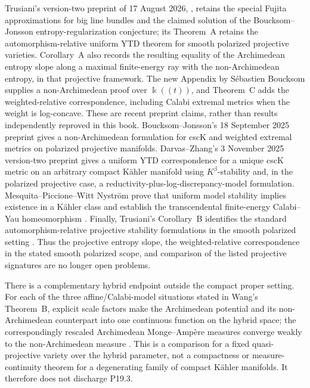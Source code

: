 \documentclass[11pt,a4paper]{article}
\theoremstyle{definition}
\theoremstyle{remark}
\begin{document}
Trusiani's version-two preprint of 17 August 2026,
\cite[Theorem~B and Corollary~A]{Trusiani26}, retains the special Fujita
approximations for big line bundles and the claimed solution of the
Boucksom--Jonsson entropy-regularization conjecture; its Theorem~A retains
the automorphism-relative uniform YTD theorem for smooth polarized
projective varieties.  Corollary~A also records the resulting equality of
the Archimedean entropy slope along a maximal finite-energy ray with the
non-Archimedean entropy, in that projective framework.  The new Appendix by
S\'ebastien Boucksom supplies a non-Archimedean proof over
\(\Bbbk((t))\), and Theorem~C adds the weighted-relative correspondence,
including Calabi extremal metrics when the weight is log-concave.  These are
recent preprint claims, rather than results independently reproved in this
book.  Boucksom--Jonsson's 18 September 2025
preprint \cite{BJ25WeightedYTD} gives a
non-Archimedean formulation for cscK and weighted extremal metrics on
polarized projective manifolds.  Darvas--Zhang's 3 November 2025 version-two
preprint \cite[Theorems~1.6 and~5.5]{DarvasZhang25YTD} gives a uniform
YTD correspondence for a unique cscK metric on an arbitrary compact
Kähler manifold using \(K^\beta\)-stability and, in the polarized
projective case, a reductivity-plus-log-discrepancy-model formulation.
Mesquita--Piccione--Witt Nyström prove that uniform model stability implies
existence in a Kähler class and establish the transcendental finite-energy
Calabi--Yau homeomorphism \cite[Theorems~A and~B]{MPWN25}.  Finally,
Trusiani's Corollary~B identifies the standard automorphism-relative
projective stability formulations in the smooth polarized setting
\cite{Trusiani26}.  Thus the projective entropy slope, the weighted-relative
correspondence in the stated smooth polarized scope, and comparison of the
listed projective signatures are no longer open problems.

There is a complementary hybrid endpoint outside the compact proper setting.
For each of the three affine/Calabi-model situations stated in Wang's
Theorem~B, explicit scale factors make the Archimedean potential and its
non-Archimedean counterpart into one continuous function on the hybrid space;
the correspondingly rescaled Archimedean Monge--Amp\`ere measures converge
weakly to the non-Archimedean measure \cite[Theorem~B]{Wang25NACalabiYau}.
This is a comparison for a fixed quasi-projective variety over the hybrid
parameter, not a compactness or measure-continuity theorem for a degenerating
family of compact K\"ahler manifolds.  It therefore does not discharge
P19.3.
\end{document}
